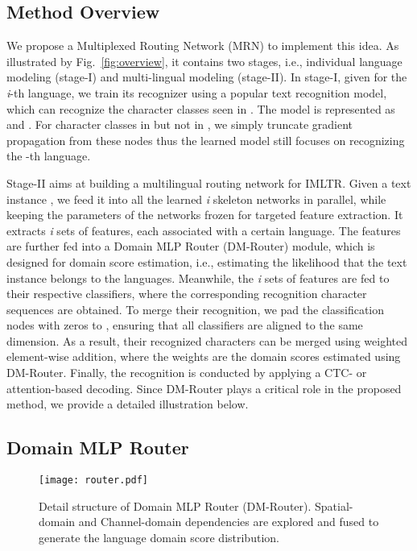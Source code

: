 \documentclass[10pt,twocolumn,letterpaper]{article}
\begin{document}
\subsection{Method Overview}
We propose a Multiplexed Routing Network (MRN) to implement this idea. As illustrated by Fig.~\ref{fig:overview}, it contains two stages, i.e., individual language modeling (stage-I) and multi-lingual modeling (stage-II). In stage-I, given  for the \emph{i}-th language, we train its recognizer using a popular text recognition model, which can recognize the character classes seen in . The model is represented as  and . For character classes in  but not in , we simply truncate gradient propagation from these nodes thus the learned model still focuses on recognizing the -th language.

Stage-II aims at building a multilingual routing network for IMLTR. Given a text instance , we feed it into all the learned \emph{i} skeleton networks in parallel, while keeping the parameters of the networks frozen for targeted feature extraction. It extracts \emph{i} sets of features, each associated with a certain language. The features are further fed into a Domain MLP Router (DM-Router) module, which is designed for domain score estimation, i.e., estimating the likelihood that the text instance belongs to the languages. Meanwhile, the \emph{i} sets of features are fed to their respective classifiers, where the corresponding recognition character sequences are obtained. To merge their recognition, we pad the classification nodes with zeros to , ensuring that all classifiers are aligned to the same dimension. As a result, their recognized characters can be merged using weighted element-wise addition, where the weights are the domain scores estimated using DM-Router. Finally, the recognition is conducted by applying a CTC- or attention-based decoding. Since DM-Router plays a critical role in the proposed method, we provide a detailed illustration below.

\subsection{Domain MLP Router}

\begin{figure}[]
\centering
\texttt{[image: router.pdf]} \caption{Detail structure of Domain MLP Router (DM-Router). Spatial-domain and Channel-domain dependencies are explored and fused to generate the language domain score distribution. }
\label{fig1:router}
\end{figure}
\end{document}
